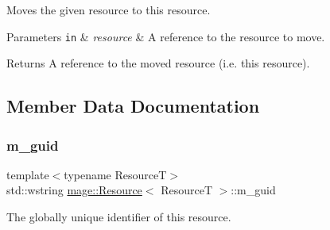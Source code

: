 Moves the given resource to this resource.


\begin{DoxyParams}[1]{Parameters}
\mbox{\tt in}  & {\em resource} & A reference to the resource to move. \\
\hline
\end{DoxyParams}
\begin{DoxyReturn}{Returns}
A reference to the moved resource (i.\+e. this resource). 
\end{DoxyReturn}


\subsection{Member Data Documentation}
\mbox{\label{classmage_1_1_resource_a47049a8d37e7097cec53551ed118309c}} 
\subsubsection{\texorpdfstring{m\+\_\+guid}{m\_guid}}
{\footnotesize\ttfamily template$<$typename ResourceT$>$ \\
std\+::wstring \mbox{\hyperlink{classmage_1_1_resource}{mage\+::\+Resource}}$<$ ResourceT $>$\+::m\+\_\+guid\hspace{0.3cm}{\ttfamily [private]}}

The globally unique identifier of this resource. 